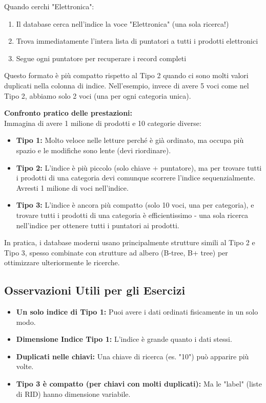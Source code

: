 \begin{enumerate}
    Quando cerchi "Elettronica":
    \begin{enumerate}
        \item Il database cerca nell'indice la voce "Elettronica" (una sola ricerca!)
        \item Trova immediatamente l'intera lista di puntatori a tutti i prodotti elettronici
        \item Segue ogni puntatore per recuperare i record completi
    \end{enumerate}
    
    Questo formato è più compatto rispetto al Tipo 2 quando ci sono molti valori duplicati nella colonna di indice. Nell'esempio, invece di avere 5 voci come nel Tipo 2, abbiamo solo 2 voci (una per ogni categoria unica).
\end{enumerate}

\textbf{Confronto pratico delle prestazioni:}\\
Immagina di avere 1 milione di prodotti e 10 categorie diverse:
\begin{itemize}
    \item \textbf{Tipo 1:} Molto veloce nelle letture perché è già ordinato, ma occupa più spazio e le modifiche sono lente (devi riordinare).
    \item \textbf{Tipo 2:} L'indice è più piccolo (solo chiave + puntatore), ma per trovare tutti i prodotti di una categoria devi comunque scorrere l'indice sequenzialmente. Avresti 1 milione di voci nell'indice.
    \item \textbf{Tipo 3:} L'indice è ancora più compatto (solo 10 voci, una per categoria), e trovare tutti i prodotti di una categoria è efficientissimo - una sola ricerca nell'indice per ottenere tutti i puntatori ai prodotti.
\end{itemize}

In pratica, i database moderni usano principalmente strutture simili al Tipo 2 e Tipo 3, spesso combinate con strutture ad albero (B-tree, B+ tree) per ottimizzare ulteriormente le ricerche.

\subsection{Osservazioni Utili per gli Esercizi}
\begin{itemize}
    \item \textbf{Un solo indice di Tipo 1:} Puoi avere i dati ordinati fisicamente in un solo modo.
    \item \textbf{Dimensione Indice Tipo 1:} L'indice è grande quanto i dati stessi.
    \item \textbf{Duplicati nelle chiavi:} Una chiave di ricerca (es. "10") può apparire più volte.
    \item \textbf{Tipo 3 è compatto (per chiavi con molti duplicati):} Ma le "label" (liste di RID) hanno dimensione variabile.
\end{itemize}

